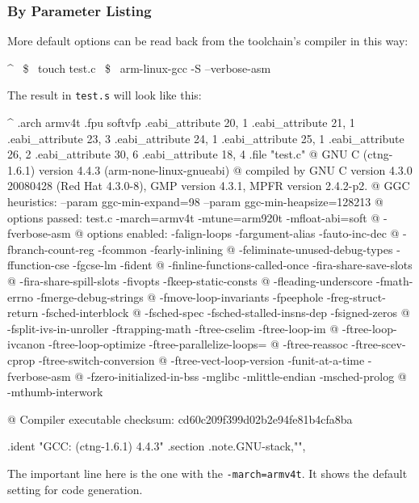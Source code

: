 \subsubsection{By Parameter Listing}

More default options can be read back from the toolchain's compiler in this way:

\begin{ptxshell}[escapechar=~]{^}
~\$~ touch test.c
~\$~ arm-linux-gcc -S --verbose-asm
\end{ptxshell}

The result in \texttt{test.s} will look like this:

\begin{ptxshell}[escapechar=~]{^}
   .arch armv4t
   .fpu softvfp
   .eabi_attribute 20, 1
   .eabi_attribute 21, 1
   .eabi_attribute 23, 3
   .eabi_attribute 24, 1
   .eabi_attribute 25, 1
   .eabi_attribute 26, 2
   .eabi_attribute 30, 6
   .eabi_attribute 18, 4
   .file "test.c"
@ GNU C (ctng-1.6.1) version 4.4.3 (arm-none-linux-gnueabi)
@  compiled by GNU C version 4.3.0 20080428 (Red Hat 4.3.0-8), GMP version 4.3.1, MPFR version 2.4.2-p2.
@ GGC heuristics: --param ggc-min-expand=98 --param ggc-min-heapsize=128213
@ options passed:  test.c -march=armv4t -mtune=arm920t -mfloat-abi=soft
@ -fverbose-asm
@ options enabled:  -falign-loops -fargument-alias -fauto-inc-dec
@ -fbranch-count-reg -fcommon -fearly-inlining
@ -feliminate-unused-debug-types -ffunction-cse -fgcse-lm -fident
@ -finline-functions-called-once -fira-share-save-slots
@ -fira-share-spill-slots -fivopts -fkeep-static-consts
@ -fleading-underscore -fmath-errno -fmerge-debug-strings
@ -fmove-loop-invariants -fpeephole -freg-struct-return -fsched-interblock
@ -fsched-spec -fsched-stalled-insns-dep -fsigned-zeros
@ -fsplit-ivs-in-unroller -ftrapping-math -ftree-cselim -ftree-loop-im
@ -ftree-loop-ivcanon -ftree-loop-optimize -ftree-parallelize-loops=
@ -ftree-reassoc -ftree-scev-cprop -ftree-switch-conversion
@ -ftree-vect-loop-version -funit-at-a-time -fverbose-asm
@ -fzero-initialized-in-bss -mglibc -mlittle-endian -msched-prolog
@ -mthumb-interwork

@ Compiler executable checksum: cd60c209f399d02b2e94fe81b4cfa8ba

   .ident   "GCC: (ctng-1.6.1) 4.4.3"
   .section .note.GNU-stack,"",%
\end{ptxshell}

The important line here is the one with the \texttt{-march=armv4t}. It shows
the default setting for code generation.

